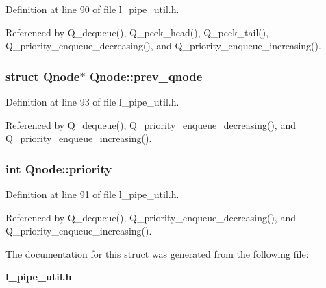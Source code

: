 Definition at line 90 of file l\_\-pipe\_\-util.h.

Referenced by Q\_\-dequeue(), Q\_\-peek\_\-head(), Q\_\-peek\_\-tail(), Q\_\-priority\_\-enqueue\_\-decreasing(), and Q\_\-priority\_\-enqueue\_\-increasing().
\subsubsection{\setlength{\rightskip}{0pt plus 5cm}struct \bf{Qnode}$\ast$ \bf{Qnode::prev\_\-qnode}}\label{structQnode_ef9b69f39290fed76fa1d90abf33abf3}




Definition at line 93 of file l\_\-pipe\_\-util.h.

Referenced by Q\_\-dequeue(), Q\_\-priority\_\-enqueue\_\-decreasing(), and Q\_\-priority\_\-enqueue\_\-increasing().
\subsubsection{\setlength{\rightskip}{0pt plus 5cm}int \bf{Qnode::priority}}\label{structQnode_b3dc52a9270a3beba7d4fcc3b9c0fc10}




Definition at line 91 of file l\_\-pipe\_\-util.h.

Referenced by Q\_\-dequeue(), Q\_\-priority\_\-enqueue\_\-decreasing(), and Q\_\-priority\_\-enqueue\_\-increasing().

The documentation for this struct was generated from the following file:\begin{CompactItemize}
\item 
\bf{l\_\-pipe\_\-util.h}\end{CompactItemize}
